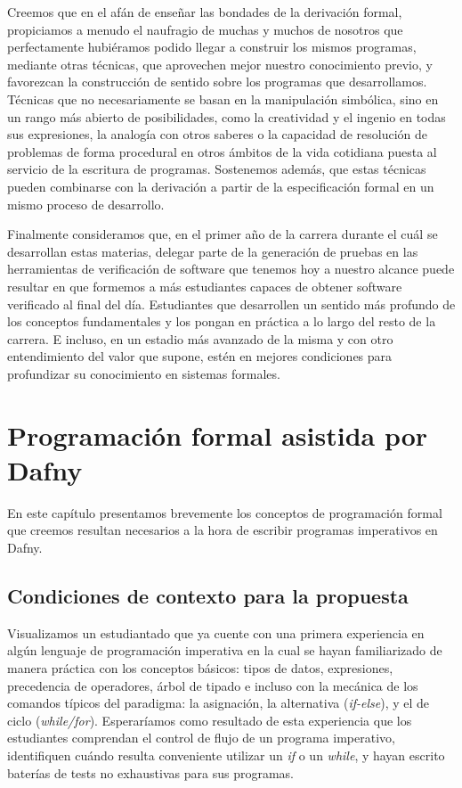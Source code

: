 \documentclass[12pt, a4paper, openany, fleqn]{book}
\begin{document}
    Creemos que en el afán de enseñar las bondades de la derivación formal, propiciamos a menudo el naufragio de muchas y muchos de nosotros que perfectamente hubiéramos podido llegar a construir los mismos programas, mediante otras técnicas, que aprovechen mejor nuestro conocimiento previo, y favorezcan la construcción de sentido sobre los programas que desarrollamos. Técnicas que no necesariamente se basan en la manipulación simbólica, sino en un rango más abierto de posibilidades, como la creatividad y el ingenio en todas  sus expresiones, la analogía con otros saberes o la capacidad de resolución de problemas de forma procedural en otros ámbitos de la vida cotidiana puesta al servicio de la escritura de programas. Sostenemos además, que estas técnicas pueden combinarse con la derivación a partir de la especificación formal en un mismo proceso de desarrollo.

    Finalmente consideramos que, en el primer año de la carrera durante el cuál se desarrollan estas materias, delegar parte de la generación de pruebas en las herramientas de verificación de software que tenemos hoy a nuestro alcance puede resultar en que formemos a más estudiantes capaces de obtener software verificado al final del día. Estudiantes que desarrollen un sentido más profundo de los conceptos fundamentales y los pongan en práctica a lo largo del resto de la carrera. E incluso, en un estadio más avanzado de la misma y con otro entendimiento del valor que supone, estén en mejores condiciones para profundizar su conocimiento en sistemas formales.

    \chapter{Programación formal asistida por Dafny}

    En este capítulo presentamos brevemente los conceptos de programación formal que creemos resultan necesarios a la hora de escribir programas imperativos en Dafny.

    \section{Condiciones de contexto para la propuesta}
    Visualizamos un estudiantado que ya cuente con una primera experiencia en algún lenguaje de programación imperativa en la cual se hayan familiarizado de manera práctica con los conceptos básicos: tipos de datos, expresiones, precedencia de operadores, árbol de tipado e incluso con la mecánica de los comandos típicos del paradigma: la asignación, la alternativa (\textit{if-else}), y el de ciclo (\textit{while/for}). Esperaríamos como resultado de esta experiencia que los estudiantes comprendan el control de flujo de un programa imperativo, identifiquen cuándo resulta conveniente utilizar un \textit{if} o un \textit{while}, y hayan escrito baterías de tests no exhaustivas para sus programas.
\end{document}
